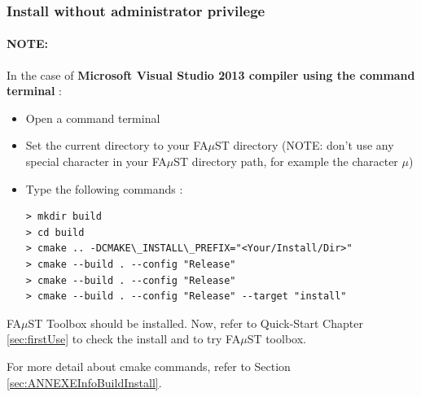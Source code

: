 \subsubsection{Install without administrator privilege}
\label{sec:NoAdminWinVisualStudioTerminalBasicInstall}

\paragraph{NOTE:}In the case of \textbf{Microsoft Visual Studio 2013 compiler using the command terminal} :

\begin{itemize}
\item Open a command terminal
\item Set the current directory to your FA$\mu$ST directory (NOTE: don't use any special character in your FA$\mu$ST directory path, for example the character $\mu$)
\item Type the following commands : 

\begin{lstlisting}
> mkdir build
> cd build
> cmake .. -DCMAKE\_INSTALL\_PREFIX="<Your/Install/Dir>" 
> cmake --build . --config "Release"
> cmake --build . --config "Release"
> cmake --build . --config "Release" --target "install"
\end{lstlisting}
\end{itemize}

FA$\mu$ST Toolbox should be installed. Now, refer to Quick-Start Chapter \ref{sec:firstUse} to check the install and to try FA$\mu$ST toolbox.

For more detail about cmake commands, refer to Section \ref{sec:ANNEXEInfoBuildInstall}.



